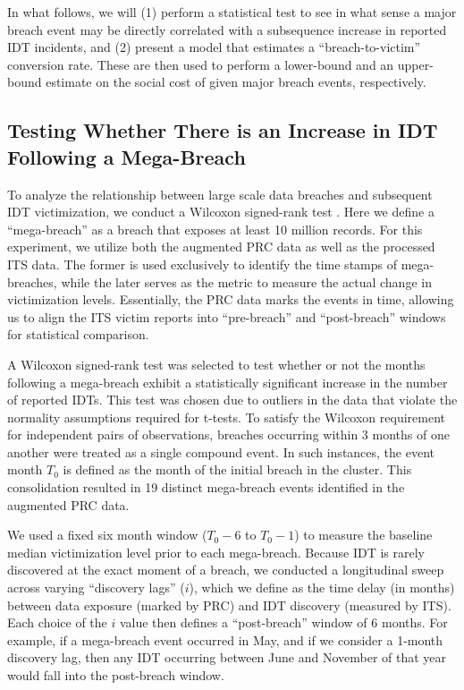 In what follows, we will (1) perform a statistical test to see in what sense a major breach event may be directly correlated with a subsequence increase in reported IDT incidents, and (2) present a model that estimates a ``breach-to-victim'' conversion rate. These are then used to perform a lower-bound and an upper-bound estimate on the social cost of given major breach events, respectively.

\subsection{Testing Whether There is an Increase in IDT Following a Mega-Breach}
\label{sec:wilcoxon_methods}

To analyze the relationship between large scale data breaches and subsequent IDT victimization, we conduct a Wilcoxon signed-rank test \cite{conover1999practical}. Here we define a ``mega-breach'' as a breach that exposes at least 10 million records. For this experiment, we utilize both the augmented PRC data as well as the processed ITS data. %
The former is used exclusively to identify the time stamps of mega-breaches, while the later serves as the metric to measure the actual change in victimization levels. Essentially, the PRC data marks the events in time, allowing us to align the ITS victim reports into ``pre-breach'' and ``post-breach'' windows for statistical comparison. 

A Wilcoxon signed-rank test was selected to test whether or not the months following a mega-breach exhibit a statistically significant increase in the number of reported IDTs. This test was chosen due to outliers in the data that violate the normality assumptions required for t-tests. To satisfy the Wilcoxon requirement for independent pairs of observations, breaches occurring within 3 months of one another were treated as a single compound event. In such instances, the event month $T_0$ is defined as the month of the initial breach in the cluster. This consolidation resulted in 19 distinct mega-breach events identified in the augmented PRC data.

We used a fixed six month window ($T_0-6$ to $T_0-1$) to measure the baseline median victimization level prior to each mega-breach. Because IDT is rarely discovered at the exact moment of a breach, we conducted a longitudinal sweep across varying ``discovery lags'' ($i$), which we define as the time delay (in months) between data exposure (marked by PRC) and IDT discovery (measured by ITS). Each choice of the $i$ value then defines a ``post-breach'' window of 6 months. For example, if a mega-breach event occurred in May, and if we consider a 1-month discovery lag, then any IDT occurring between June and November of that year would fall into the post-breach window. 

